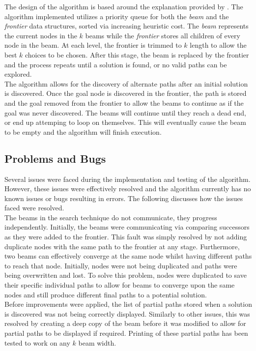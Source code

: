 \documentclass[]{article}
\begin{document}
The design of the algorithm is based around the explanation provided by \cite{winston}. The algorithm implemented utilizes a priority queue for both the \textit{beam} and the \textit{frontier} data structures, sorted via increasing heuristic cost. The \textit{beam} represents the current nodes in the $k$ beams while the \textit{frontier} stores all children of every node in the beam. At each level, the frontier is trimmed to $k$ length to allow the best $k$ choices to be chosen. After this stage, the beam is replaced by the frontier and the process repeats until a solution is found, or no valid paths can be explored. \\

The algorithm allows for the discovery of alternate paths after an initial solution is discovered. Once the goal node is discovered in the frontier, the path is stored and the goal removed from the frontier to allow the beams to continue as if the goal was never discovered. The beams will continue until they reach a dead end, or end up attemping to loop on themselves. This will eventually cause the beam to be empty and the algorithm will finish execution.

\subsection*{Problems and Bugs}

Several issues were faced during the implementation and testing of the algorithm. However, these issues were effectively resolved and the algorithm currently has no known issues or bugs resulting in errors. The following discusses how the issues faced were resolved.\\

The beams in the search technique do not communicate, they progress independently. Initially, the beams were communicating via comparing successors as they were added to the frontier. This fault was simply resolved by not adding duplicate nodes with the same path to the frontier at any stage. Furthermore, two beams can effectively converge at the same node whilst having different paths to reach that node. Initially, nodes were not being duplicated and paths were being overwritten and lost. To solve this problem, nodes were duplicated to save their specific individual paths to allow for beams to converge upon the same nodes and still produce different final paths to a potential solution.\\

Before improvements were applied, the list of partial paths stored when a solution is discovered was not being correctly displayed. Similarly to other issues, this was resolved by creating a deep copy of the beam before it was modified to allow for partial paths to be displayed if required. Printing of these partial paths has been tested to work on any $k$ beam width.\\
\end{document}
